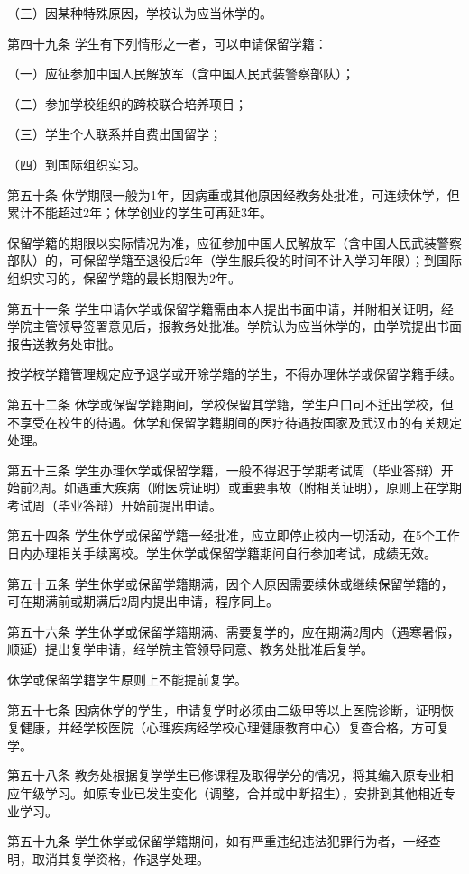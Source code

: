 \documentclass[UTF8,12pt,a4paper]{report}
\begin{document}
（三）因某种特殊原因，学校认为应当休学的。

第四十九条  学生有下列情形之一者，可以申请保留学籍：

（一）应征参加中国人民解放军（含中国人民武装警察部队）；

（二）参加学校组织的跨校联合培养项目；

（三）学生个人联系并自费出国留学；

（四）到国际组织实习。

第五十条  休学期限一般为1年，因病重或其他原因经教务处批准，可连续休学，但累计不能超过2年；休学创业的学生可再延3年。

保留学籍的期限以实际情况为准，应征参加中国人民解放军（含中国人民武装警察部队）的，可保留学籍至退役后2年（学生服兵役的时间不计入学习年限）；到国际组织实习的，保留学籍的最长期限为2年。

第五十一条  学生申请休学或保留学籍需由本人提出书面申请，并附相关证明，经学院主管领导签署意见后，报教务处批准。学院认为应当休学的，由学院提出书面报告送教务处审批。

按学校学籍管理规定应予退学或开除学籍的学生，不得办理休学或保留学籍手续。

第五十二条  休学或保留学籍期间，学校保留其学籍，学生户口可不迁出学校，但不享受在校生的待遇。休学和保留学籍期间的医疗待遇按国家及武汉市的有关规定处理。

第五十三条  学生办理休学或保留学籍，一般不得迟于学期考试周（毕业答辩）开始前2周。如遇重大疾病（附医院证明）或重要事故（附相关证明），原则上在学期考试周（毕业答辩）开始前提出申请。

第五十四条  学生休学或保留学籍一经批准，应立即停止校内一切活动，在5个工作日内办理相关手续离校。学生休学或保留学籍期间自行参加考试，成绩无效。

第五十五条  学生休学或保留学籍期满，因个人原因需要续休或继续保留学籍的，可在期满前或期满后2周内提出申请，程序同上。

第五十六条  学生休学或保留学籍期满、需要复学的，应在期满2周内（遇寒暑假，顺延）提出复学申请，经学院主管领导同意、教务处批准后复学。

休学或保留学籍学生原则上不能提前复学。

第五十七条  因病休学的学生，申请复学时必须由二级甲等以上医院诊断，证明恢复健康，并经学校医院（心理疾病经学校心理健康教育中心）复查合格，方可复学。

第五十八条  教务处根据复学学生已修课程及取得学分的情况，将其编入原专业相应年级学习。如原专业已发生变化（调整，合并或中断招生），安排到其他相近专业学习。

第五十九条  学生休学或保留学籍期间，如有严重违纪违法犯罪行为者，一经查明，取消其复学资格，作退学处理。
\end{document}
